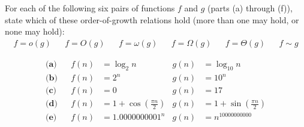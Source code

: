 \documentclass[12pt,twoside]{article}
\begin{document}
\begin{problem}{20}
For each of the following six pairs of functions $f$ and $g$ (parts (a) through (f)), state which of these order-of-growth relations hold (more than one may hold, or none may hold):
\begin{align*}
 f = o(g) && f=O(g) && f=\omega(g) && f=\Omega(g) && f=\Theta(g) && f \sim g
\end{align*}

\begin{align*}
\textbf{(a)}&& f(n) &= \log_2 n &  g(n) &= \log_{10} n \\
\textbf{(b)}&& f(n) &= 2^n & g(n) &= 10^n\\
\textbf{(c)}&& f(n) &= 0 & g(n) &= 17\\
\textbf{(d)}&& f(n) &= 1+\cos\left(\frac{\pi n}{2}\right) & g(n) &= 1+\sin\left(\frac{\pi n}{2}\right)\\
\textbf{(e)}&& f(n) &= {1.0000000001}^n & g(n) &= n^{10000000000}\\
\end{align*}

\end{problem}
\end{document}
